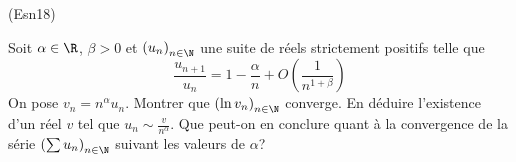 \begin{tiny}(Esn18)\end{tiny} Soit $\alpha \in \R$, $\beta>0$ et $\left(u_n\right)_{n\in \N}$ une suite de réels strictement positifs telle que
\begin{displaymath}
  \frac{u_{n+1}}{u_n} = 1 - \frac{\alpha}{n} + O(\frac{1}{n^{1+\beta}})
\end{displaymath}
On pose $v_n = n^{\alpha} u_n$. Montrer que $\left( \ln v_n\right)_{n\in \N}$ converge. En déduire l'existence d'un réel $v$ tel que $u_n \sim \frac{v}{n^{\alpha}}$.\newline
Que peut-on en conclure quant à la convergence de la série $\left(\sum u_n\right)_{n\in \N}$ suivant les valeurs de $\alpha$?